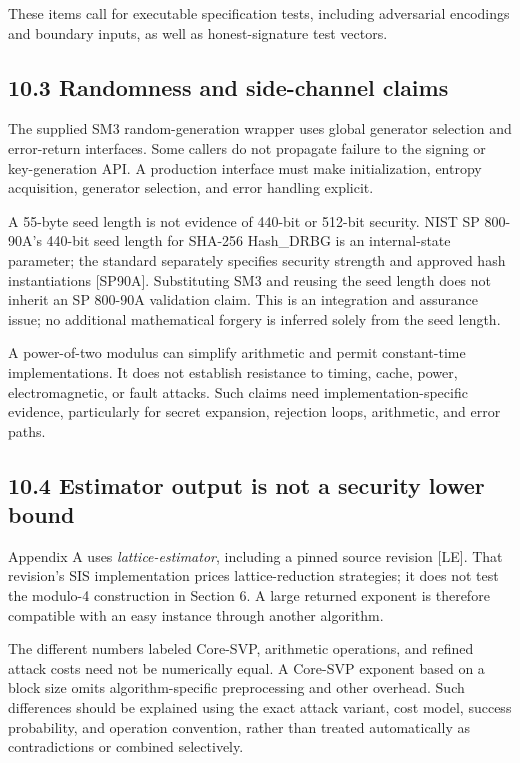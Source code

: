 \documentclass[
  american,
  10pt,
  a4paper,
]{article}
\begin{document}
These items call for executable specification tests, including
adversarial encodings and boundary inputs, as well as honest-signature
test vectors.

\subsection{10.3 Randomness and side-channel
claims}\label{randomness-and-side-channel-claims}

The supplied SM3 random-generation wrapper uses global generator
selection and error-return interfaces. Some callers do not propagate
failure to the signing or key-generation API. A production interface
must make initialization, entropy acquisition, generator selection, and
error handling explicit.

A 55-byte seed length is not evidence of 440-bit or 512-bit security.
NIST SP 800-90A's 440-bit seed length for SHA-256 Hash\_DRBG is an
internal-state parameter; the standard separately specifies security
strength and approved hash instantiations {[}SP90A{]}. Substituting SM3
and reusing the seed length does not inherit an SP 800-90A validation
claim. This is an integration and assurance issue; no additional
mathematical forgery is inferred solely from the seed length.

A power-of-two modulus can simplify arithmetic and permit constant-time
implementations. It does not establish resistance to timing, cache,
power, electromagnetic, or fault attacks. Such claims need
implementation-specific evidence, particularly for secret expansion,
rejection loops, arithmetic, and error paths.

\subsection{10.4 Estimator output is not a security lower
bound}\label{estimator-output-is-not-a-security-lower-bound}

Appendix A uses \emph{lattice-estimator}, including a pinned source
revision {[}LE{]}. That revision's SIS implementation prices
lattice-reduction strategies; it does not test the modulo-4 construction
in Section 6. A large returned exponent is therefore compatible with an
easy instance through another algorithm.

The different numbers labeled Core-SVP, arithmetic operations, and
refined attack costs need not be numerically equal. A Core-SVP exponent
based on a block size omits algorithm-specific preprocessing and other
overhead. Such differences should be explained using the exact attack
variant, cost model, success probability, and operation convention,
rather than treated automatically as contradictions or combined
selectively.
\end{document}
